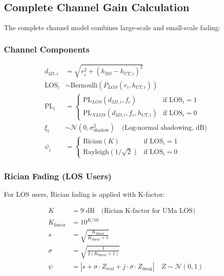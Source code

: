 \documentclass[12pt,a4paper]{article}
\begin{document}
\subsection{Complete Channel Gain Calculation}

The complete channel model combines large-scale and small-scale fading:

\subsubsection{Channel Components}

\begin{align}
d_{3D,i} &= \sqrt{r_i^2 + (h_{BS} - h_{UT,i})^2} \\
\text{LOS}_i &\sim \text{Bernoulli}(P_{LOS}(r_i, h_{UT,i})) \\
\text{PL}_i &= \begin{cases}
\text{PL}_{LOS}(d_{3D,i}, f_c) & \text{if } \text{LOS}_i = 1 \\
\text{PL}_{NLOS}(d_{3D,i}, f_c, h_{UT,i}) & \text{if } \text{LOS}_i = 0
\end{cases} \\
\xi_i &\sim \mathcal{N}(0, \sigma_{\text{shadow}}^2) \quad \text{(Log-normal shadowing, dB)} \\
\psi_i &= \begin{cases}
\text{Rician}(K) & \text{if } \text{LOS}_i = 1 \\
\text{Rayleigh}(1/\sqrt{2}) & \text{if } \text{LOS}_i = 0
\end{cases}
\end{align}

\subsubsection{Rician Fading (LOS Users)}

For LOS users, Rician fading is applied with K-factor:

\begin{align}
K &= 9 \text{ dB} \quad \text{(Rician K-factor for UMa LOS)} \\
K_{\text{linear}} &= 10^{K/10} \\
s &= \sqrt{\frac{K_{\text{linear}}}{K_{\text{linear}} + 1}} \\
\sigma &= \sqrt{\frac{1}{2(K_{\text{linear}} + 1)}} \\
\psi &= |s + \sigma \cdot Z_{\text{real}} + j \cdot \sigma \cdot Z_{\text{imag}}| \quad Z \sim \mathcal{N}(0,1)
\end{align}
\end{document}
